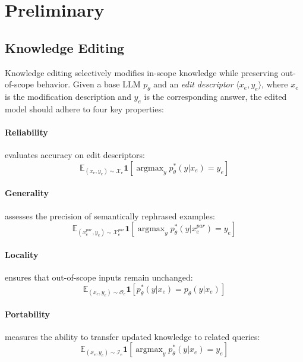 \section{Preliminary}
\subsection{Knowledge Editing}
Knowledge editing selectively modifies in-scope knowledge while preserving out-of-scope behavior. Given a base LLM $p_{\theta}$ and an \textit{edit descriptor} $\langle x_e, y_e \rangle$, where $x_e$ is the modification description and $y_e$ is the corresponding answer, the edited model should adhere to four key properties:

\paragraph{Reliability} evaluates accuracy on edit descriptors:
\begin{equation}
\mathbb{E}_{(x_e, y_e) \sim \mathcal{X}_e}\mathbf{1}[\mathop{\arg\max}_{y} p_{\theta}^*(y|x_e) = y_e]
\end{equation}

\paragraph{Generality} assesses the precision of semantically rephrased examples:
\begin{equation}
\mathbb{E}_{(x_e^{par}, y_e) \sim \mathcal{X}_e^{par}}\mathbf{1}[\mathop{\arg\max}_{y} p_{\theta}^*(y|x_e^{par}) = y_e]
\end{equation}

\paragraph{Locality} ensures that out-of-scope inputs remain unchanged:
\begin{equation}
\mathbb{E}_{(x_e, y_e) \sim \mathcal{O}_e}\mathbf{1}[ p_{\theta}^*(y|x_e) = p_{\theta}(y|x_e)]
\end{equation}

\paragraph{Portability} measures the ability to transfer updated knowledge to related queries:
\begin{equation}
\mathbb{E}_{(x_e, y_e) \sim \mathcal{I}_e}\mathbf{1}[\mathop{\arg\max}_{y} p_{\theta}^*(y|x_e) = y_e]
\end{equation}

